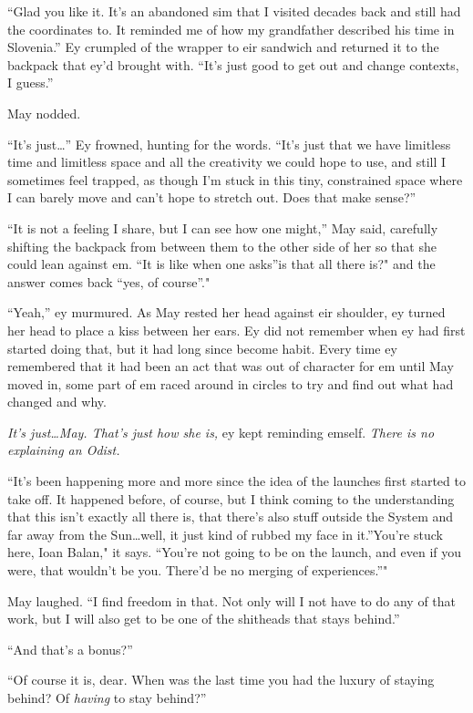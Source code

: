 ``Glad you like it. It's an abandoned sim that I visited decades back and still had the coordinates to. It reminded me of how my grandfather described his time in Slovenia.'' Ey crumpled of the wrapper to eir sandwich and returned it to the backpack that ey'd brought with. ``It's just good to get out and change contexts, I guess.''

May nodded.

``It's just\ldots{}'' Ey frowned, hunting for the words. ``It's just that we have limitless time and limitless space and all the creativity we could hope to use, and still I sometimes feel trapped, as though I'm stuck in this tiny, constrained space where I can barely move and can't hope to stretch out. Does that make sense?''

``It is not a feeling I share, but I can see how one might,'' May said, carefully shifting the backpack from between them to the other side of her so that she could lean against em. ``It is like when one asks''is that all there is?" and the answer comes back ``yes, of course''."

``Yeah,'' ey murmured. As May rested her head against eir shoulder, ey turned her head to place a kiss between her ears. Ey did not remember when ey had first started doing that, but it had long since become habit. Every time ey remembered that it had been an act that was out of character for em until May moved in, some part of em raced around in circles to try and find out what had changed and why.

\emph{It's just\ldots May. That's just how she is,} ey kept reminding emself. \emph{There is no explaining an Odist.}

``It's been happening more and more since the idea of the launches first started to take off. It happened before, of course, but I think coming to the understanding that this isn't exactly all there is, that there's also stuff outside the System and far away from the Sun\ldots well, it just kind of rubbed my face in it.''You're stuck here, Ioan Balan," it says. ``You're not going to be on the launch, and even if you were, that wouldn't be you. There'd be no merging of experiences.''"

May laughed. ``I find freedom in that. Not only will I not have to do any of that work, but I will also get to be one of the shitheads that stays behind.''

``And that's a bonus?''

``Of course it is, dear. When was the last time you had the luxury of staying behind? Of \emph{having} to stay behind?''

